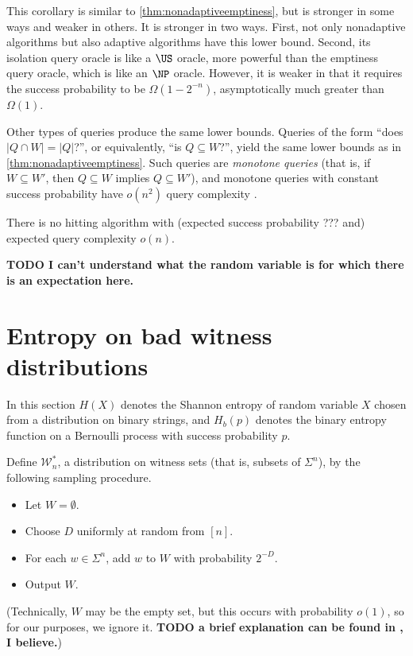 \documentclass{article}
\newcommand{\todo}[1]{\textbf{TODO #1}}
\newcommand{\mc}{\mathcal}
\begin{document}
This corollary is similar to \autoref{thm:nonadaptiveemptiness}, but is stronger in some ways and weaker in others.
It is stronger in two ways.
First, not only nonadaptive algorithms but also adaptive algorithms have this lower bound.
Second, its isolation query oracle is like a $\US$ oracle, more powerful than the emptiness query oracle, which is like an $\NP$ oracle.
However, it is weaker in that it requires the success probability to be $\Omega(1 - 2^{-n})$, asymptotically much greater than $\Omega(1)$.

Other types of queries produce the same lower bounds.
Queries of the form ``does $|Q \cap W| = |Q|$?'', or equivalently, ``is $Q \subseteq W$?'', yield the same lower bounds as in \autoref{thm:nonadaptiveemptiness}.
Such queries are \emph{monotone queries} (that is, if $W \subseteq W'$, then $Q \subseteq W$ implies $Q \subseteq W'$), and monotone queries with constant success probability have $o(n^2)$ query complexity \autocite[Theorem~1.3]{krw14}.

\begin{theorem}
  There is no hitting algorithm with (expected success probability ??? and) expected query complexity $o(n)$.
\end{theorem}

\todo{I can't understand what the random variable is for which there is an expectation here.}

\section{Entropy on bad witness distributions}

In this section $H(X)$ denotes the Shannon entropy of random variable $X$ chosen from a distribution on binary strings, and $H_b(p)$ denotes the binary entropy function on a Bernoulli process with success probability $p$.

Define $\mc{W}_n^*$, a distribution on witness sets (that is, subsets of $\Sigma^n$), by the following sampling procedure.
\begin{itemize}
\item Let $W = \emptyset$.
\item Choose $D$ uniformly at random from $[n]$.
\item For each $w \in \Sigma^n$, add $w$ to $W$ with probability $2^{-D}$.
\item Output $W$.
\end{itemize}
(Technically, $W$ may be the empty set, but this occurs with probability $o(1)$, so for our purposes, we ignore it.
\todo{a brief explanation can be found in \autocite{krw14}, I believe.})
\end{document}
